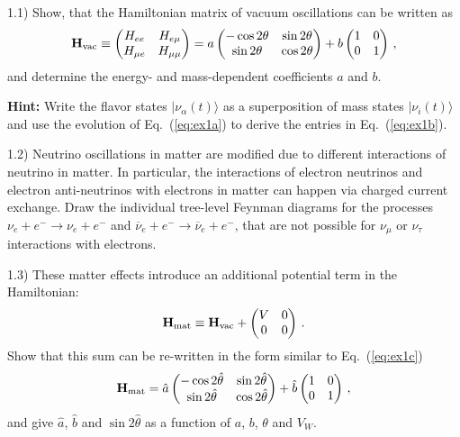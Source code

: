 \documentclass[a4paper,11pt]{report}
\begin{document}
1.1) Show, that the Hamiltonian matrix of vacuum oscillations can be written as
\begin{equation}\label{eq:ex1c}
{\bf H}_{\rm vac} \equiv\begin{pmatrix}H_{ee}&H_{e\mu}\\H_{\mu e}&H_{\mu\mu}\end{pmatrix} = a\begin{pmatrix}-\cos2\theta&\sin2\theta\\\sin2\theta&\cos2\theta\end{pmatrix} + b\begin{pmatrix}1&0\\0&1\end{pmatrix}\,,
\end{equation}
and determine the energy- and mass-dependent coefficients $a$ and $b$.

{\bf Hint:} Write the flavor states $|\nu_\alpha(t)\rangle$ as a superposition of mass states $|\nu_i(t)\rangle$ and use the evolution of Eq.~(\ref{eq:ex1a}) to derive the entries in Eq.~(\ref{eq:ex1b}).

1.2) Neutrino oscillations in matter are modified due to different interactions of neutrino in matter. In particular, the interactions of electron neutrinos and electron anti-neutrinos with electrons in matter can happen via charged current exchange. Draw the individual tree-level Feynman diagrams for the processes $\nu_e+e^- \to \nu_e +e^-$ and $\overline{\nu}_e+e^- \to \overline{\nu}_e +e^-$, that are not possible for $\nu_\mu$ or $\nu_\tau$ interactions with electrons. 

1.3) These matter effects introduce an additional potential term in the Hamiltonian:
\begin{equation}\label{eq:ex1d}
{\bf H}_{\rm mat} \equiv {\bf H}_{\rm vac} + \begin{pmatrix}V&0\\0&0\end{pmatrix}\,.
\end{equation}
Show that this sum can be re-written in the form similar to Eq.~(\ref{eq:ex1c})
\begin{equation}\label{eq:ex1e}
{\bf H}_{\rm mat} = \hat{a}\begin{pmatrix}-\cos2\hat\theta&\sin2\hat\theta\\\sin2\hat\theta&\cos2\hat\theta\end{pmatrix} + \hat{b}\begin{pmatrix}1&0\\0&1\end{pmatrix}\,,
\end{equation}
and give $\hat{a}$, $\hat{b}$ and $\sin2\hat{\theta}$ as a function of $a$, $b$, $\theta$ and $V_W$.
\end{document}
